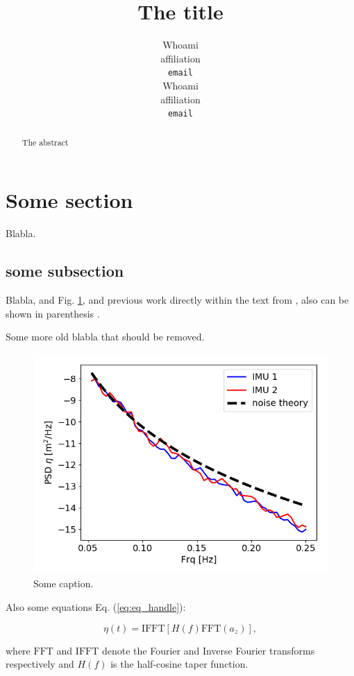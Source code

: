 \documentclass{article}
\title{The title}
\author{
  Whoami\\
  affiliation\\
  \texttt{email} \\
   \And
  Whoami\\
  affiliation\\
  \texttt{email} \\
}
\begin{document}
\maketitle

\begin{abstract}
  The abstract
\end{abstract}


\section{Some section}

Blabla.

\subsection{some subsection}

Blabla, and Fig. \ref{fig:fig_handle}, and previous work directly within the text from \citet{JGRC21649}, also can be shown in parenthesis \citep{JGRC21649}.

Some more old blabla that should be removed.

\begin{figure}[h]
  \begin{center}
    \includegraphics[width=.45\textwidth]{./Figures/noise_verification}
    \caption{\label{fig:fig_handle} Some caption.}
  \end{center}
\end{figure}

Also some equations Eq. (\ref{eq:eq_handle}):

\begin{equation}
	\eta(t) = \mathrm{IFFT}\left[H(f)\mathrm{FFT}(a_z)\right],
	\label{eq:eq_handle}
\end{equation}

where $\mathrm{FFT}$ and $\mathrm{IFFT}$ denote the Fourier and Inverse Fourier transforms respectively and $H(f)$ is the half-cosine taper function. \\
\end{document}
